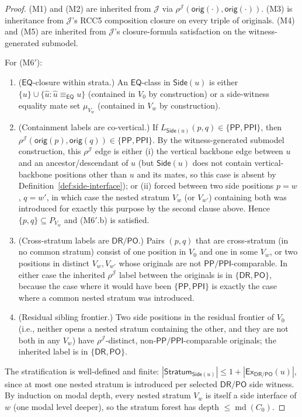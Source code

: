 \documentclass[11pt]{article}
\newcommand{\EQ}{\mathsf{EQ}}
\newcommand{\DR}{\mathsf{DR}}
\newcommand{\PO}{\mathsf{PO}}
\newcommand{\PP}{\mathsf{PP}}
\newcommand{\PPI}{\mathsf{PPI}}
\newcommand{\Ex}{\mathsf{Ex}}
\newcommand{\J}{\mathcal J}
\newcommand{\orig}{\mathsf{orig}}
\newcommand{\eqc}{\equiv_{\EQ}}
\newcommand{\Stratum}{\mathsf{Stratum}}
\newcommand{\Side}{\mathsf{Side}}
\newcommand{\md}{\operatorname{md}}
\begin{document}
\begin{proof}
(M1) and (M2) are inherited from $\J$ via $\rho^\J(\orig(\cdot),
\orig(\cdot))$.  (M3) is inheritance from $\J$'s RCC5 composition
closure on every triple of originals.  (M4) and (M5) are inherited
from $\J$'s closure-formula satisfaction on the witness-generated
submodel.

For (M6$'$):
\begin{enumerate}[label=(M6$'$.\alph*)]
\item ($\EQ$-closure within strata.)  An $\EQ$-class in $\Side(u)$
  is either $\{u\}\cup\{\widehat u:\widehat u\eqc u\}$
  (contained in $V_0$ by construction) or a side-witness equality
  mate set $\mu_{V_w}$ (contained in $V_w$ by construction).
\item (Containment labels are co-vertical.)  If $L_{\Side(u)}(p,q)
  \in\{\PP,\PPI\}$, then $\rho^\J(\orig(p),\orig(q))\in\{\PP,\PPI\}$.
  By the witness-generated submodel construction, this $\rho^\J$
  edge is either (i) the vertical backbone edge between $u$ and an
  ancestor/descendant of $u$ (but $\Side(u)$ does not contain
  vertical-backbone positions other than $u$ and its mates, so this
  case is absent by Definition~\ref{def:side-interface}); or (ii)
  forced between two side positions $p=w$, $q=w'$, in which case
  the nested stratum $V_w$ (or $V_{w'}$) containing both was
  introduced for exactly this purpose by the second clause above.
  Hence $\{p,q\}\subseteq P_{V_w}$ and (M6$'$.b) is satisfied.
\item (Cross-stratum labels are $\DR/\PO$.)  Pairs $(p,q)$ that
  are cross-stratum (in no common stratum) consist of one position
  in $V_0$ and one in some $V_w$, or two positions in distinct
  $V_w,V_{w'}$ whose originals are not $\PP/\PPI$-comparable.  In
  either case the inherited $\rho^\J$ label between the originals
  is in $\{\DR,\PO\}$, because the case where it would have been
  $\{\PP,\PPI\}$ is exactly the case where a common nested stratum
  was introduced.
\item (Residual sibling frontier.)  Two side positions in the
  residual frontier of $V_0$ (i.e., neither opens a nested stratum
  containing the other, and they are not both in any $V_w$) have
  $\rho^\J$-distinct, non-$\PP/\PPI$-comparable originals; the
  inherited label is in $\{\DR,\PO\}$.
\end{enumerate}

The stratification is well-defined and finite: $|\Stratum_{\Side(u)}|
\le 1+|\Ex_{\DR/\PO}(u)|$, since at most one nested stratum is
introduced per selected $\DR/\PO$ side witness.  By induction on
modal depth, every nested stratum $V_w$ is itself a side interface
of $w$ (one modal level deeper), so the stratum forest has depth
$\le\md(C_0)$.
\end{proof}
\end{document}
